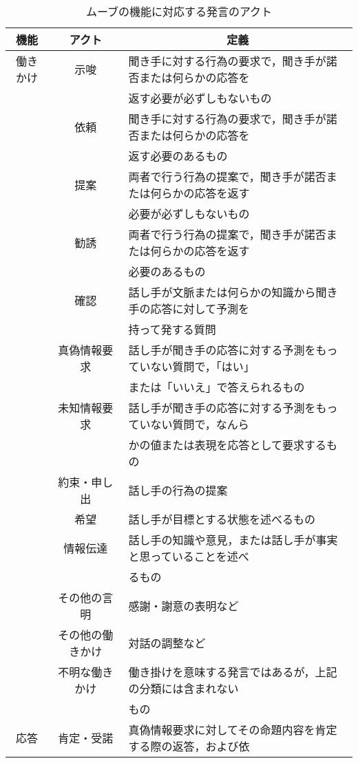 \begin{table}[tbt]
  \begin{center}
    \caption{ムーブの機能に対応する発言のアクト}
    \label{tbl:acts}
    \begin{tabular}{|c|c|l|}
      \hline
      \multicolumn{1}{|c|}{機能} & \multicolumn{1}{|c|}{アクト} & \multicolumn{1}{|c|}{定義} \\
      \hline
      \hline
      働きかけ&示唆&聞き手に対する行為の要求で，聞き手が諾否または何らかの応答を\\
      &&返す必要が必ずしもないもの\\
      &依頼&聞き手に対する行為の要求で，聞き手が諾否または何らかの応答を\\
      &&返す必要のあるもの\\
      &提案&両者で行う行為の提案で，聞き手が諾否または何らかの応答を返す\\
      &&必要が必ずしもないもの\\
      &勧誘&両者で行う行為の提案で，聞き手が諾否または何らかの応答を返す\\
      &&必要のあるもの\\
      &確認&話し手が文脈または何らかの知識から聞き手の応答に対して予測を\\
      &&持って発する質問\\ 
      &真偽情報要求&話し手が聞き手の応答に対する予測をもっていない質問で，「はい」\\
      &&または「いいえ」で答えられるもの\\
      &未知情報要求&話し手が聞き手の応答に対する予測をもっていない質問で，なんら\\
      &&かの値または表現を応答として要求するもの\\
      &約束・申し出&話し手の行為の提案\\ 
      &希望&話し手が目標とする状態を述べるもの\\
      &情報伝達&話し手の知識や意見，または話し手が事実と思っていることを述べ\\
      &&るもの\\
      &その他の言明&感謝・謝意の表明など\\
      &その他の働きかけ&対話の調整など\\
      &不明な働きかけ&働き掛けを意味する発言ではあるが，上記の分類には含まれない\\
      &&もの\\
      \hline
      応答&肯定・受諾&真偽情報要求に対してその命題内容を肯定する際の返答，および依\\

\end{tabular}
\end{center}
\end{table}
